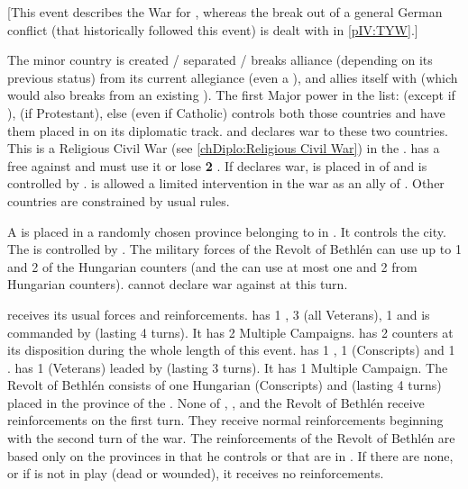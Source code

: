 \newpage\startevents




[This event describes the War for \paysBoheme, whereas the
break out of a general German conflict (that historically followed this event)
is dealt with in \ref{pIV:TYW}.]

\phevnt
{} The minor country \paysBoheme is created / separated
/ breaks alliance (depending on its previous status) from its current
allegiance (even a \GE), and allies itself with \paysPalatinat (which would
also breaks from an existing \GE). The first Major power in the list: \FRA
(except if \CATHCR), \POL (if Protestant), else \SUE (even if Catholic)
controls both those countries and have them placed in \EG on its diplomatic
track.
\aparag \paysBaviere and \hab declares war to these two countries. This is a
Religious Civil War (see \ref{chDiplo:Religious Civil War}) in the \HRE.
\bparag \AUS has a free \CB against \paysBoheme and must use it or lose {\bf
  2} \STAB.
\bparag If \HAB declares war, \paysBaviere is placed in \EG of \HAB and is
controlled by \MAJHAB.
\bparag \SPA is allowed a limited intervention in the war as an ally of
\HAB. Other countries are constrained by usual rules.

\bparag A \REVOLT \faceplus is placed in a randomly chosen province belonging
to \HAB in \paysHongrie. It controls the city. The \REVOLT is controlled by
\RUS.
\bparag The military forces of the Revolt of Bethlén can use up to 1 \ARMY and
2 \LD of the Hungarian counters (and the \HAB can use at most one \ARMY and 2
\LD from Hungarian counters).
\aparag \TUR cannot declare war against \HAB at this turn.

\phadm
\aparag \AUSMin receives its usual forces and reinforcements.
\aparag \paysBaviere has 1 \ARMY \faceplus, 3 \LD (all Veterans), 1 \fortress
and is commanded by  (lasting 4 turns).  It has 2
Multiple Campaigns. \paysBaviere has 2 \ARMY counters at its disposition
during the whole length of this event.
\aparag \paysBoheme has 1 \ARMY \faceplus, 1 \LD (Conscripts) and 1 \fortress.
\aparag \paysPalatinat has 1 \ARMY \faceplus (Veterans) leaded by
 (lasting 3 turns). It has 1 Multiple Campaign.
\aparag The Revolt of Bethlén consists of one Hungarian \ARMY \faceplus
(Conscripts) and  (lasting 4 turns) placed in the
province of the \REVOLT .
\aparag None of \paysBaviere, \paysBoheme, \paysPalatinat and the Revolt of
Bethlén receive reinforcements on the first turn. They receive normal
reinforcements beginning with the second turn of the war.
\aparag The reinforcements of the Revolt of Bethlén are based only on the
provinces in \payshongrie that he controls or that are in \REVOLT . If there
are none, or if \leaderBethlen is not in play (dead or wounded), it receives
no reinforcements.


